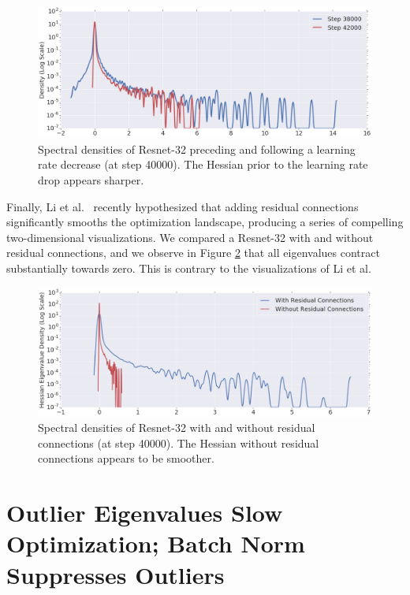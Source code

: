 \documentclass{article}
\begin{document}
\begin{figure}[ht]
\includegraphics[width=\textwidth]{ResNet_32_rate_drop.png}
\vspace{-0.5cm}
\caption{Spectral densities of Resnet-32 preceding and following a learning rate decrease (at step 40000). The Hessian prior to the learning rate drop appears sharper. \label{fig:rate_drop}}
\end{figure}

Finally, Li et al.\ \cite{li2018visualizing} recently hypothesized that adding residual connections significantly smooths the optimization landscape, producing a series of compelling two-dimensional visualizations. We compared a Resnet-32 with and without residual connections, and we observe in Figure \ref{fig:residual} that all eigenvalues contract substantially towards zero. This is contrary to the visualizations of Li et al.

\begin{figure}[ht]
\includegraphics[width=\textwidth]{ResNet_48k_residual_connections.png}
\vspace{-0.5cm}
\caption{Spectral densities of Resnet-32 with and without residual connections (at step 40000). The Hessian without residual connections appears to be smoother. \label{fig:residual}}
\end{figure}

\section{Outlier Eigenvalues Slow Optimization; Batch Norm Suppresses Outliers} \label{sec:batch_norm}
\end{document}

